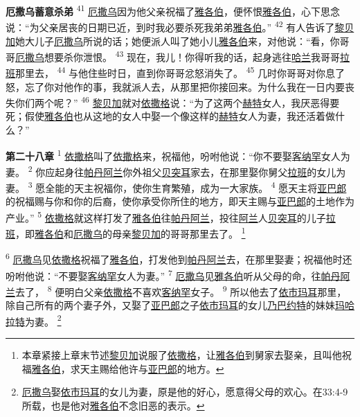 \textbf{厄撒乌蓄意杀弟\quad}
\textsuperscript{41}
\uline{厄撒乌}因为他父亲祝福了\uline{雅各伯}，便怀恨\uline{雅各伯}，心下思念说：“为父亲居丧的日期已近，到时我必要杀死我弟弟\uline{雅各伯}。”
\textsuperscript{42}
有人告诉了\uline{黎贝加}她大儿子\uline{厄撒乌}所说的话；她便派人叫了她小儿\uline{雅各伯}来，对他说：“看，你哥哥\uline{厄撒乌}想要杀你泄恨。
\textsuperscript{43}
现在，我儿！你得听我的话，起身逃往\uline{哈兰}我哥哥\uline{拉班}那里去，
\textsuperscript{44}
与他住些时日，直到你哥哥忿怒消失了。
\textsuperscript{45}
几时你哥哥对你息了怒，忘了你对他作的事，我就派人去，从那里把你接回来。为什么我在一日内要丧失你们两个呢？”
\textsuperscript{46}
\uline{黎贝加}就对\uline{依撒格}说：“为了这两个\uline{赫特}女人，我厌恶得要死；假使\uline{雅各伯}也从这地的女人中娶一个像这样的\uline{赫特}女人为妻，我还活着做什么？”

\textbf{第二十八章\quad}
\textsuperscript{1}
\uline{依撒格}叫了\uline{依撒格}来，祝福他，吩咐他说：“你不要娶\uline{客纳罕}女人为妻。
\textsuperscript{2}
你应起身往\uline{帕丹阿兰}你外祖父\uline{贝突耳}家去，在那里娶你舅父\uline{拉班}的女儿为妻。
\textsuperscript{3}
愿全能的天主祝福你，使你生育繁殖，成为一大家族。
\textsuperscript{4}
愿天主将\uline{亚巴郎}的祝福赐与你和你的后裔，使你承受你所住的地方，即天主赐与\uline{亚巴郎}的土地作为产业。”
\textsuperscript{5}
\uline{依撒格}就这样打发了\uline{雅各伯}往\uline{帕丹阿兰}，投往\uline{阿兰}人\uline{贝突耳}的儿子\uline{拉班}，即\uline{雅各伯}和\uline{厄撒乌}的母亲\uline{黎贝加}的哥哥那里去了。
\footnote{本章紧接上章末节述\uline{黎贝加}说服了\uline{依撒格}，让\uline{雅各伯}到舅家去娶亲，且叫他祝福\uline{雅各伯}，求天主赐给他许与\uline{亚巴郎}的地方。}

\textsuperscript{6}
\uline{厄撒乌}见\uline{依撒格}祝福了\uline{雅各伯}，打发他到\uline{帕丹阿兰}去，在那里娶妻；祝福他时还吩咐他说：“不要娶\uline{客纳罕}女人为妻。”
\textsuperscript{7}
\uline{厄撒乌}见\uline{雅各伯}听从父母的命，往\uline{帕丹阿兰}去了，
\textsuperscript{8}
便明白父亲\uline{依撒格}不喜欢\uline{客纳罕}女子。
\textsuperscript{9}
所以他去了\uline{依市玛耳}那里，除自己所有的两个妻子外，又娶了\uline{亚巴郎}之子\uline{依市玛耳}的女儿\uline{乃巴约特}的妹妹\uline{玛哈}\uline{拉特}为妻。
\footnote{\uline{厄撒乌}娶\uline{依市}\uline{玛耳}的女儿为妻，原是他的好心，愿意得父母的欢心。在33:4-9所载，也是他对\uline{雅各伯}不念旧恶的表示。}

